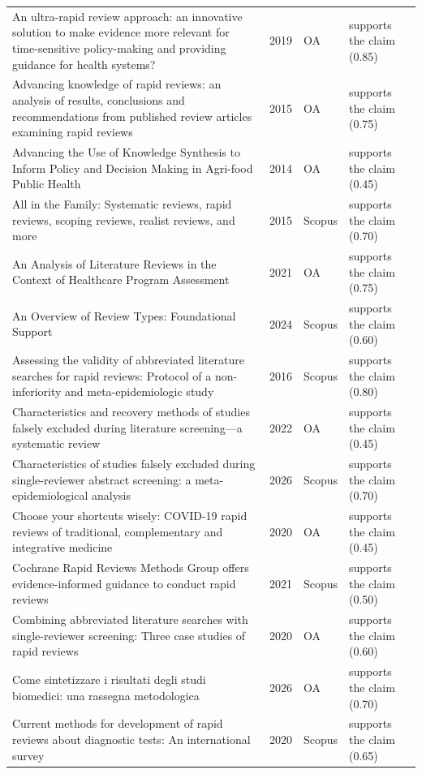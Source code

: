 \begin{longtable}{@{}%
  >{\raggedright\arraybackslash}p{}c%
  >{\raggedright\arraybackslash}p{}%
  >{\raggedright\arraybackslash}p{}@{}}
35 An ultra-rapid review approach: an innovative solution to make evidence more relevant for time-sensitive policy-making and providing guidance for health systems? & 2019 & OA & supports the claim (0.85) \\
Advancing knowledge of rapid reviews: an analysis of results, conclusions and recommendations from published review articles examining rapid reviews & 2015 & OA & supports the claim (0.75) \\
Advancing the Use of Knowledge Synthesis to Inform Policy and Decision Making in Agri-food Public Health & 2014 & OA & supports the claim (0.45) \\
All in the Family: Systematic reviews, rapid reviews, scoping reviews, realist reviews, and more & 2015 & Scopus & supports the claim (0.70) \\
An Analysis of Literature Reviews in the Context of Healthcare Program Assessment & 2021 & OA & supports the claim (0.75) \\
An Overview of Review Types: Foundational Support & 2024 & Scopus & supports the claim (0.60) \\
Assessing the validity of abbreviated literature searches for rapid reviews: Protocol of a non-inferiority and meta-epidemiologic study & 2016 & Scopus & supports the claim (0.80) \\
Characteristics and recovery methods of studies falsely excluded during literature screening---a systematic review & 2022 & OA & supports the claim (0.45) \\
Characteristics of studies falsely excluded during single-reviewer abstract screening: a meta-epidemiological analysis & 2026 & Scopus & supports the claim (0.70) \\
Choose your shortcuts wisely: COVID-19 rapid reviews of traditional, complementary and integrative medicine & 2020 & OA & supports the claim (0.45) \\
Cochrane Rapid Reviews Methods Group offers evidence-informed guidance to conduct rapid reviews & 2021 & Scopus & supports the claim (0.50) \\
Combining abbreviated literature searches with single-reviewer screening: Three case studies of rapid reviews & 2020 & OA & supports the claim (0.60) \\
Come sintetizzare i risultati degli studi biomedici: una rassegna metodologica & 2026 & OA & supports the claim (0.70) \\
Current methods for development of rapid reviews about diagnostic tests: An international survey & 2020 & Scopus & supports the claim (0.65) \\

\end{longtable}

